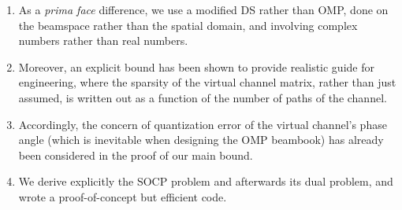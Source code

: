 \begin{enumerate}
\item As a \textit{prima face} difference, we use a modified DS rather than OMP, done on the beamspace rather than the spatial domain, and involving complex numbers rather than real numbers.
\item Moreover, an explicit bound has been shown to provide realistic guide for engineering, where the sparsity of the virtual channel matrix, rather than just assumed, is written out as a function of the number of paths of the channel.
\item Accordingly, the concern of quantization error of the virtual channel's phase angle (which is inevitable when designing the OMP beambook) has already been considered in the proof of our main bound.
\item We derive explicitly the SOCP problem and afterwards its dual problem, and wrote a proof-of-concept but efficient code.
\end{enumerate}
